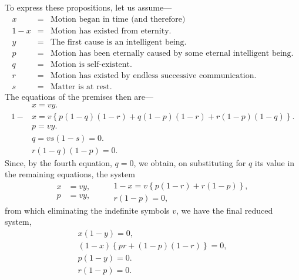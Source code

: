 \documentclass[oneside]{book}
\begin{document}
To express these propositions, let us assume---
\begin{eqnarray*}
  x &=& \textrm{Motion began in time (and therefore)}\\
1-x &=& \textrm{Motion has existed from eternity.}\\
  y &=& \textrm{The first cause is an intelligent being.}\\
  p &=& \textrm{Motion has been eternally caused by some eternal intelligent being.}\\
  q &=& \textrm{Motion is self-existent.}\\
  r &=& \textrm{Motion has existed by endless successive communication.}\\
  s &=& \textrm{Matter is at rest.}
\end{eqnarray*}
The equations of the premises then are---
\[
\begin{aligned}
  &x = vy.\\
1-&x = v \left\{p\left(1-q\right)\left(1-r\right) +q\left(1-p\right) \left(1-r\right) +r\left(1-p\right)\left(1-q\right)\right\}.\\
  &p = vy.\\
  &q = vs\left(1-s\right) = 0.\\
  &r\left(1-q\right)\left(1-p\right) = 0.
\end{aligned}
\]
Since, by the fourth equation, $q = 0$, we obtain, on substituting
for $q$ its value in the remaining equations, the system
 \[
 \begin{aligned}
   x &= vy,  \\
   p &= vy,
 \end{aligned}
 \qquad
 \begin{gathered}
   1-x = v\left\{p\left(1-r\right) +r\left(1-p\right)\right\}, \\
   r\left(1-p\right) = 0,
 \end{gathered}
 \]
from which eliminating the indefinite symbols $v$, we have the
final reduced system,
\setcounter{equation}{0}
\begin{eqnarray}
x\left(1-y\right)=0,\\
\left(1-x\right)\left\{pr + \left(1-p\right)\left(1-r\right)\right\}=0,\\
p\left(1-y\right)=0.\\
r\left(1-p\right)=0.
\end{eqnarray}
\end{document}
